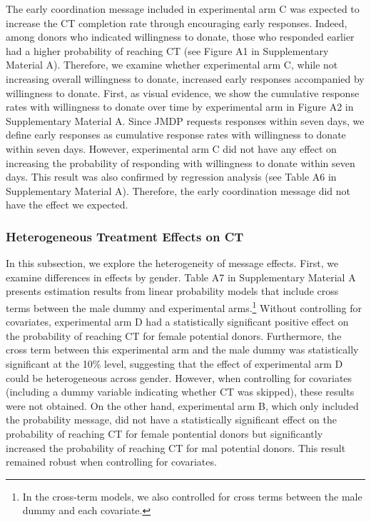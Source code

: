\documentclass[12pt, a4paper]{article}
\begin{document}
The early coordination message included in experimental arm C was expected to increase the CT completion rate through encouraging early responses. Indeed, among donors who indicated willingness to donate, those who responded earlier had a higher probability of reaching CT (see Figure A1 in Supplementary Material A). Therefore, we examine whether experimental arm C, while not increasing overall willingness to donate, increased early responses accompanied by willingness to donate. First, as visual evidence, we show the cumulative response rates with willingness to donate over time by experimental arm in Figure A2 in Supplementary Material A. Since JMDP requests responses within seven days, we define early responses as cumulative response rates with willingness to donate within seven days. However, experimental arm C did not have any effect on increasing the probability of responding with willingness to donate within seven days. This result was also confirmed by regression analysis (see Table A6 in Supplementary Material A). Therefore, the early coordination message did not have the effect we expected.

\hypertarget{heterogeneous-treatment-effects-on-ct}{%
\subsubsection{Heterogeneous Treatment Effects on CT}\label{heterogeneous-treatment-effects-on-ct}}

In this subsection, we explore the heterogeneity of message effects. First, we examine differences in effects by gender. Table A7 in Supplementary Material A presents estimation results from linear probability models that include cross terms between the male dummy and experimental arms.\footnote{In the cross-term models, we also controlled for cross terms between the male dummy and each covariate.} Without controlling for covariates, experimental arm D had a statistically significant positive effect on the probability of reaching CT for female potential donors. Furthermore, the cross term between this experimental arm and the male dummy was statistically significant at the 10\% level, suggesting that the effect of experimental arm D could be heterogeneous across gender. However, when controlling for covariates (including a dummy variable indicating whether CT was skipped), these results were not obtained. On the other hand, experimental arm B, which only included the probability message, did not have a statistically significant effect on the probability of reaching CT for female pontential donors but significantly increased the probability of reaching CT for mal potential donors. This result remained robust when controlling for covariates.
\end{document}
